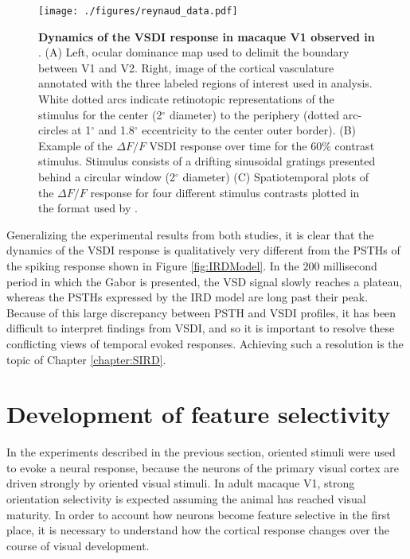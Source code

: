 \documentclass[phd,ianc,twoside]{infthesis}
\begin{document}
\begin{figure}
\center
\texttt{[image: ./figures/reynaud\_data.pdf]}
\caption{{\bf Dynamics of the VSDI response in macaque V1 observed in
    \citet{reynaud_jn12}}. (A) Left, ocular dominance map used to delimit
  the boundary between V1 and V2. Right, image of the cortical
  vasculature annotated with the three labeled regions of interest used
  in analysis. White dotted arcs indicate retinotopic representations of
  the stimulus for the center (2$^\circ$ diameter) to the periphery
  (dotted arc-circles at 1$^\circ$ and 1.8$^\circ$ eccentricity to the
  center outer border). (B) Example of the $\Delta F/F$ VSDI response
  over time for the $60\%$ contrast stimulus. Stimulus consists of a
  drifting sinusoidal gratings presented behind a circular window
  (2$^\circ$ diameter) (C) Spatiotemporal plots of the $\Delta F/F$
  response for four different stimulus contrasts plotted in the format
  used by \citet{sit_neuron09}.}
  \label{fig:reynaud_data}
\end{figure}


Generalizing the experimental results from both studies, it is clear
that the dynamics of the VSDI response is qualitatively very different
from the PSTHs of the spiking response shown in Figure
\ref{fig:IRDModel}. In the $200$ millisecond period in which the Gabor
is presented, the VSD signal slowly reaches a plateau, whereas the PSTHs
expressed by the IRD model are long past their peak. Because of this large
discrepancy between PSTH and VSDI profiles, it has been difficult to
interpret findings from VSDI, and so it is important to resolve these
conflicting views of temporal evoked responses.  Achieving such
a resolution is the topic of Chapter
\ref{chapter:SIRD}.

\section{Development of feature selectivity}
\label{section:development_background}

In the experiments described in the previous section, oriented stimuli
were used to evoke a neural response, because the neurons of the primary
visual cortex are driven strongly by oriented visual stimuli. In adult
macaque V1, strong orientation selectivity is expected assuming the
animal has reached visual maturity. In order to account how neurons
become feature selective in the first place, it is necessary to
understand how the cortical response changes over the course of visual
development.
\end{document}
